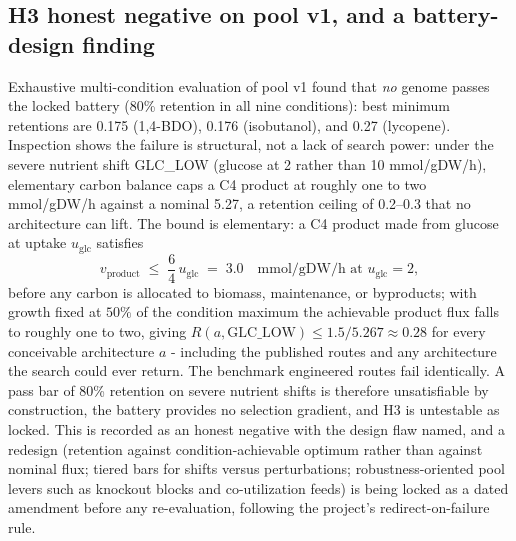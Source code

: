 \documentclass[12pt,a4paper]{article}
\begin{document}
\subsection{H3 honest negative on pool v1, and a battery-design finding}
Exhaustive multi-condition evaluation of pool v1 found that \emph{no} genome passes the locked battery (80\% retention in all nine conditions): best minimum retentions are 0.175 (1,4-BDO), 0.176 (isobutanol), and 0.27 (lycopene). Inspection shows the failure is structural, not a lack of search power: under the severe nutrient shift GLC\_LOW (glucose at 2 rather than 10 mmol/gDW/h), elementary carbon balance caps a C4 product at roughly one to two mmol/gDW/h against a nominal 5.27, a retention ceiling of 0.2--0.3 that no architecture can lift. The bound is elementary: a C4 product made from glucose at uptake $u_{\mathrm{glc}}$ satisfies
\begin{equation}
v_{\mathrm{product}} \;\le\; \frac{6}{4}\, u_{\mathrm{glc}} \;=\; 3.0 \quad \text{mmol/gDW/h at } u_{\mathrm{glc}} = 2,
\end{equation}
before any carbon is allocated to biomass, maintenance, or byproducts; with growth fixed at $50\%$ of the condition maximum the achievable product flux falls to roughly one to two, giving $R(a, \mathrm{GLC\_LOW}) \le 1.5/5.267 \approx 0.28$ for every conceivable architecture $a$ - including the published routes and any architecture the search could ever return. The benchmark engineered routes fail identically. A pass bar of 80\% retention on severe nutrient shifts is therefore unsatisfiable by construction, the battery provides no selection gradient, and H3 is untestable as locked. This is recorded as an honest negative with the design flaw named, and a redesign (retention against condition-achievable optimum rather than against nominal flux; tiered bars for shifts versus perturbations; robustness-oriented pool levers such as knockout blocks and co-utilization feeds) is being locked as a dated amendment before any re-evaluation, following the project's redirect-on-failure rule.
\end{document}
